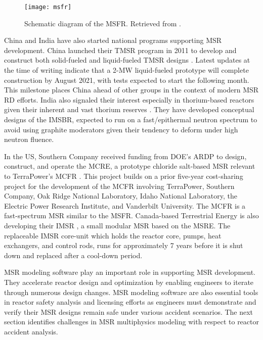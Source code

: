 \begin{figure}[htb!]
	\centering
	\texttt{[image: msfr]}
	\caption{Schematic diagram of the \gls{MSFR}. Retrieved from 
	\cite{allibert_7_2016}.}
	\label{fig:msfr}
\end{figure}

China and India have also started national programs supporting \gls{MSR}
development. China launched their \gls{TMSR} program in 2011 to develop and
construct both solid-fueled and liquid-fueled \gls{TMSR} designs
\cite{zou_research_2019}. Latest updates at the time of writing indicate that a
2-MW liquid-fueled prototype will complete construction by August
2021, with tests expected to start the following month. This milestone places
China ahead of other groups in the context of modern \gls{MSR} \gls{RD}
efforts. India also signaled their interest especially in thorium-based
reactors given their inherent and vast thorium reserves
\cite{jayaram_overview_1987}. They have developed conceptual designs of the
\gls{IMSBR}, expected to run on a fast/epithermal neutron spectrum to avoid
using graphite moderators given their tendency to deform under high neutron
fluence.

In the US, Southern Company received funding from \gls{DOE}'s
\gls{ARDP} \cite{doe_office_2021} to design, construct, and operate the
\gls{MCRE}, a prototype chloride salt-based \gls{MSR} relevant to TerraPower's
\gls{MCFR} \cite{terrapower_mcfr_2020}. This project builds on a prior
five-year cost-sharing project for the development of the \gls{MCFR} involving
TerraPower, Southern Company, Oak Ridge National Laboratory, Idaho National
Laboratory, the Electric Power Research Institute, and Vanderbilt University.
The \gls{MCFR} is a fast-spectrum \gls{MSR} similar to the \gls{MSFR}.
Canada-based Terrestrial Energy is also developing their \gls{IMSR}
\cite{leblanc_18_2017}, a small modular \gls{MSR} based on the \gls{MSRE}. The
replaceable \gls{IMSR} core-unit which holds the reactor core, pumps, heat
exchangers, and control rods, runs for approximately 7 years before it is shut
down and replaced after a cool-down period.

\gls{MSR} modeling software play an important role in supporting
\gls{MSR} development. They accelerate reactor design and optimization by
enabling engineers to iterate through numerous design changes. \gls{MSR}
modeling software are also essential tools in reactor safety analysis and
licensing efforts as engineers must demonstrate and verify their \gls{MSR}
designs remain safe under various accident scenarios. The next section
identifies challenges in \gls{MSR} multiphysics modeling with respect to
reactor accident analysis.

